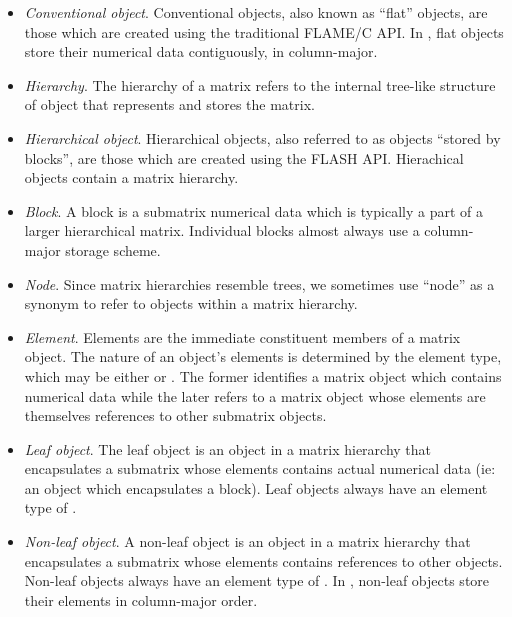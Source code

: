\begin{itemize}

\item
{\em Conventional object}.
Conventional objects, also known as ``flat'' objects, are those which are
created using the traditional FLAME/C API.
In \libflamens, flat objects store their numerical data contiguously, in
column-major.

\item
{\em Hierarchy}.
The hierarchy of a matrix refers to the internal tree-like structure of
object that represents and stores the matrix.

\item
{\em Hierarchical object}.
Hierarchical objects, also referred to as objects ``stored by blocks'',
are those which are created using the FLASH API.
Hierachical objects contain a matrix hierarchy.

\item
{\em Block}.
A block is a submatrix numerical data which is typically a part of a
larger hierarchical matrix.
Individual blocks almost always use a column-major storage scheme.


\item
{\em Node}.
Since matrix hierarchies resemble trees, we sometimes use ``node'' as a synonym
to refer to objects within a matrix hierarchy.

\item
{\em Element}.
Elements are the immediate constituent members of a matrix object.
The nature of an object's elements is determined by the element type,
which may be either \flascalar or \flamatrixns.
The former identifies a matrix object which contains numerical data while
the later refers to a matrix object whose elements are themselves references
to other submatrix objects.

\item
{\em Leaf object}.
The leaf object is an object in a matrix hierarchy that encapsulates a
submatrix whose elements contains actual numerical data (ie: an object which
encapsulates a block).
Leaf objects always have an element type of \flascalarns.

\item
{\em Non-leaf object}.
A non-leaf object is an object in a matrix hierarchy that encapsulates
a submatrix whose elements contains references to other objects.
Non-leaf objects always have an element type of \flamatrixns.
In \libflamens, non-leaf objects store their elements in column-major order.


\end{itemize}
